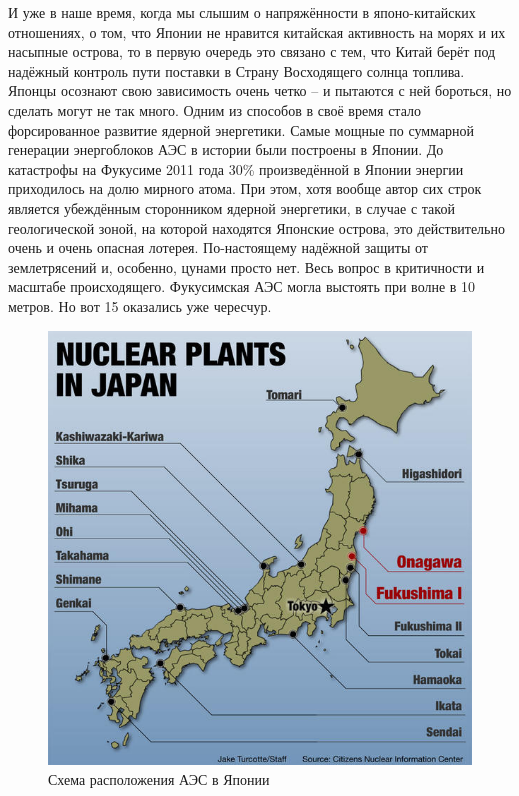 И уже в наше время, когда мы слышим о напряжённости в японо-китайских отношениях, о том, что Японии не нравится китайская активность на морях и их насыпные острова, то в первую очередь это связано с тем, что Китай берёт под надёжный контроль пути поставки в Страну Восходящего солнца топлива.
Японцы осознают свою зависимость очень четко – и пытаются с ней бороться, но сделать могут не так много. Одним из способов в своё время стало форсированное развитие ядерной энергетики. Самые мощные по суммарной генерации энергоблоков АЭС в истории были построены в Японии. До катастрофы на Фукусиме 2011 года 30\% произведённой в Японии энергии приходилось на долю мирного атома. При этом, хотя вообще автор сих строк является убеждённым сторонником ядерной энергетики, в случае с такой геологической зоной, на которой находятся Японские острова, это действительно очень и очень опасная лотерея. По-настоящему надёжной защиты от землетрясений и, особенно, цунами просто нет. Весь вопрос в критичности и масштабе происходящего. Фукусимская АЭС могла выстоять при волне в 10 метров. Но вот 15 оказались уже чересчур. 


\begin{figure}[h!tb] 
	\centering\includegraphics[scale=0.5]{Glava1/RyxsRW6tQYs.jpg}
	\caption{Схема расположения АЭС в Японии}%
\end{figure}

